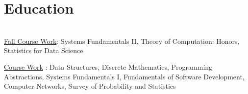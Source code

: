 

\section{Education}

\\

\hspace{0.1 in}\underline{{Fall Course Work}}: Systems Fundamentals II, Theory of Computation: Honors, Statistics for Data Science

\begin{adjustwidth}{0.1 in}{}
\underline{{Course Work}} :  Data Structures, Discrete Mathematics, Programming Abstractions, Systems Fundamentals I, Fundamentals of Software Development, Computer Networks, Survey of Probability and Statistics
\end{adjustwidth}
\sectionsep
